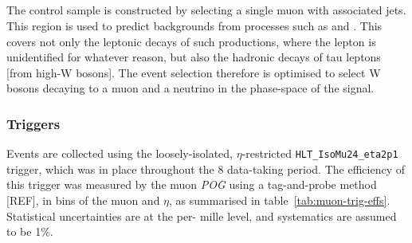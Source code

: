 
\subsection{\mj}

The \mj control sample is constructed by selecting a single muon with associated 
jets. This region is used to predict backgrounds from processes such as \wj and
\ttj. This covers not only the leptonic decays of such productions, where the 
lepton is unidentified for whatever reason, but also the hadronic decays of tau 
leptons [from high-\Pt W bosons]. The event selection therefore is optimised to 
select W bosons decaying to a muon and a neutrino in the phase-space of the 
signal.

\subsubsection{Triggers}
\label{sec:mujets_control_trigger}
Events are collected using the loosely-isolated, $\eta$-restricted
\verb!HLT_IsoMu24_eta2p1! trigger, which was in place throughout the 8 \tev
data-taking period. The efficiency of this trigger was measured by the muon \emph{POG} 
using a tag-and-probe method [REF], in bins of the muon \Pt and $\eta$, as summarised 
in table~\ref{tab:muon-trig-effs}. Statistical uncertainties are at the per-
mille level, and systematics are assumed to be 1\%.

